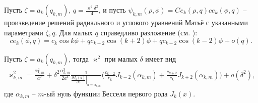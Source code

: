 Пусть $\zeta = a_k(q_{k, m})$, $q=\frac{\varkappa^2 \delta^2}{4}$, и пусть $\psi_{k,m}(\rho, \phi) = Ce_k(\rho, q)ce_k(\phi, q)$ -- произведение решений радиального и углового уравнений Матьё с указанными параметрами $\zeta, q$. Для малых $q$ справедливо разложение (см. \cite[\S~2.2, с.~122---124]{wref12}):
$$ce_k(\phi, q) = c_k \cos{k \phi} + q c_{k+2} \cos{(k+2) \phi} +q c_{k-2} \cos{(k-2) \phi} + o(q).$$ 
\begin{lemma}
Пусть $\zeta = a_k(q_{k, m})$, тогда $\varkappa^2$ при малых $\delta$ имеет вид
\begin{multline*}
\varkappa_{k, m}^2 = 
\frac{\alpha_{k, m}^2}{a^2} +  \delta^2 \frac{\alpha_{k, m}^3}{2 a^4}\frac{1}{\left.\frac{\partial J_{k} (u)}{\partial u}\right|_{u=\alpha_{k, m}}} 
\biggl(
\frac{c_{k-2}}{c_k} J_{k-2}(\alpha_{k, m}) + \frac{c_{k+2} }{c_k} J_{k+2}(\alpha_{k, m})
\biggr) + o(\delta^2),
\end{multline*}
где $\alpha_{k, m}$ -- $m$-ый нуль функции Бесселя первого рода $J_{k}(x)$.
\label{th:lemEllipse1}
\end{lemma}
